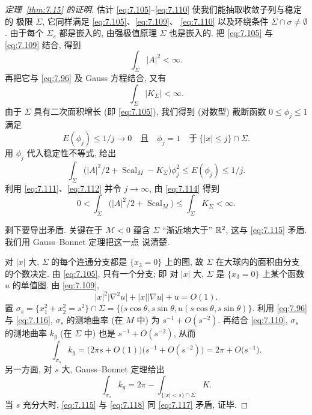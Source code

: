 \begin{proof}[定理~\ref{thm:7.15} 的证明]
估计 \eqref{eq:7.105}--\eqref{eq:7.110} 使我们能抽取收敛子列与稳定的
极限 $\Sigma$, 它同样满足 \eqref{eq:7.105}、\eqref{eq:7.109}、
\eqref{eq:7.110} 以及环绕条件 $\Sigma\cap\sigma\neq\emptyset$. 由于每个
$\Sigma_s$ 都是嵌入的, 由强极值原理 $\Sigma$ 也是嵌入的. 把
\eqref{eq:7.105} 与 \eqref{eq:7.109} 结合, 得到
\begin{equation}
\int_{\Sigma}|A|^2<\infty.
\label{eq:7.111}
\end{equation}
再把它与 \eqref{eq:7.96} 及 Gauss 方程结合, 又有
\begin{equation}
\int_{\Sigma}|K_{\Sigma}|<\infty.
\label{eq:7.112}
\end{equation}
由于 $\Sigma$ 具有二次面积增长 (即 \eqref{eq:7.105}), 我们得到 (对数型)
截断函数 $0\leq\phi_j\leq1$ 满足
\begin{equation}
E(\phi_j)\leq1/j\to0\quad\text{且}\quad
\phi_j=1\quad\text{于}\ \{|x|\leq j\}\cap\Sigma.
\label{eq:7.113}
\end{equation}
用 $\phi_j$ 代入稳定性不等式, 给出
\begin{equation}
\int_{\Sigma}\bigl(|A|^2/2+\operatorname{Scal}_M-K_{\Sigma}\bigr)\phi_j^2
\leq E(\phi_j)\leq1/j.
\label{eq:7.114}
\end{equation}
利用 \eqref{eq:7.111}、\eqref{eq:7.112} 并令 $j\to\infty$, 由
\eqref{eq:7.114} 得到
\begin{equation}
0<\int_{\Sigma}\bigl(|A|^2/2+\operatorname{Scal}_M\bigr)
\leq\int_{\Sigma}K_{\Sigma}<\infty.
\label{eq:7.115}
\end{equation}

剩下要导出矛盾. 关键在于 $\mathcal{M}<0$ 蕴含 $\Sigma$ ``渐近地大于''
$\mathbb{R}^2$, 这与 \eqref{eq:7.115} 矛盾. 我们用 Gauss--Bonnet 定理把这一点
说清楚.

对 $|x|$ 大, $\Sigma$ 的每个连通分支都是 $\{x_3=0\}$ 上的图, 故 $\Sigma$
在大球内的面积由分支的个数决定. 由 \eqref{eq:7.105}, 只有一个分支; 即
对 $|x|$ 大, $\Sigma$ 是 $\{x_3=0\}$ 上某个函数 $u$ 的单值图. 由
\eqref{eq:7.109},
\begin{equation}
|x|^2\bigl|\nabla^2u\bigr|+|x||\nabla u|+u=O(1).
\label{eq:7.116}
\end{equation}
置 $\sigma_s=\{x_1^2+x_2^2=s^2\}\cap\Sigma
=\{(s\cos\theta,s\sin\theta,u(s\cos\theta,s\sin\theta)\}$. 利用
\eqref{eq:7.96} 与 \eqref{eq:7.116}, $\sigma_s$ 的测地曲率 (在 $M$ 中)
为 $s^{-1}+O(s^{-2})$. 再结合 \eqref{eq:7.110}, $\sigma_s$ 的测地曲率
$k_g$ (在 $\Sigma$ 中) 也是 $s^{-1}+O(s^{-2})$, 从而
\begin{equation}
\int_{\sigma_s}k_g
=\bigl(2\pi s+O(1)\bigr)\bigl(s^{-1}+O(s^{-2})\bigr)
=2\pi+O\bigl(s^{-1}\bigr).
\label{eq:7.117}
\end{equation}
另一方面, 对 $s$ 大, Gauss--Bonnet 定理给出
\begin{equation}
\int_{\sigma_s}k_g=2\pi-\int_{\{|x|<s\}\cap\Sigma}K.
\label{eq:7.118}
\end{equation}
当 $s$ 充分大时, \eqref{eq:7.115} 与 \eqref{eq:7.118} 同 \eqref{eq:7.117}
矛盾, 证毕.
\end{proof}

